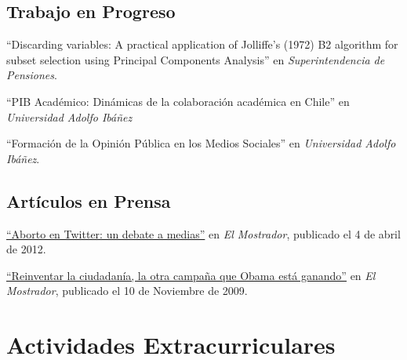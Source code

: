 \documentclass[letterpaper, 12pt]{article}
\renewenvironment{itemize}{
  \begin{list}{}{
    \setlength{\leftmargin}{0.45cm}
  }
}{
  \end{list}
}
\begin{document}
\subsection*{Trabajo en Progreso}
\begin{itemize}
\item ``Discarding variables: A practical application of Jolliffe's (1972) B2 algorithm for subset selection using Principal Components Analysis'' en {\it Superintendencia de Pensiones}.
\item ``PIB Académico: Dinámicas de la colaboración académica en Chile'' en {\it Universidad Adolfo Ibáñez}
\item ``Formación de la Opinión Pública en los Medios Sociales'' en {\it Universidad Adolfo Ibáñez}.
\end{itemize}

\subsection*{Artículos en Prensa}

\begin{itemize}
\item \href{http://www.elmostrador.cl/opinion/2012/04/04/aborto-en-twitter-un-debate-a-medias/}{``Aborto en Twitter: un debate a medias''} en {\it El Mostrador}, publicado el 4 de abril de 2012.
\item \href{http://www.uai.cl/200911165701/columna-de-opinion/columnas-opinion/reinventar-la-ciudadania-la-otra-campana-que-obama-esta-ganando}{``Reinventar la ciudadanía, la otra campaña que Obama está ganando''} en {\it El Mostrador}, publicado el 10 de Noviembre de 2009.
\end{itemize}

\section*{Actividades Extracurriculares}
\end{document}
